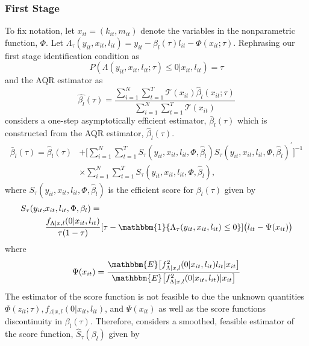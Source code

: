 \documentclass[11pt]{article}
\begin{document}
\subsubsection*{First Stage}
To fix notation, let $x_{it}=(k_{it}, m_{it})$ denote the variables in the nonparametric function, $\Phi$. Let $\Lambda_{\tau}(y_{it}, x_{it}, l_{it})=y_{it}-\beta_{l}(\tau)l_{it}-\Phi(x_{it}; \tau)$. Rephrasing our first stage identification condition as 
\begin{equation}
P(\Lambda(y_{it}, x_{it}, l_{it}; \tau)\leq0|x_{it}, l_{it})=\tau
\end{equation}
and the AQR estimator as
\begin{equation}
\hat{\beta_{l}}(\tau)=\frac{\sum_{i=1}^{N}\sum_{t=1}^{T}\mathcal{T}(x_{it})\hat{\beta}_{l}(x_{it}; \tau)}{\sum_{i=1}^{N}\sum_{t=1}^{T}\mathcal{T}(x_{it})}
\end{equation}
\cite{Lee2003} considers a one-step asymptotically efficient estimator, $\bar{\beta}_{l}(\tau)$ which is constructed from the AQR estimator, $\hat{\beta}_{l}(\tau)$.
\begin{equation}
\begin{split}
\bar{\beta}_{l}(\tau)=\hat{\beta}_{l}(\tau)&+\Big[\sum_{i=1}^{N}\sum_{t=1}^{T}S_{\tau}(y_{it}, x_{it}, l_{it},\Phi, \hat{\beta}_{l})S_{\tau}(y_{it}, x_{it}, l_{it},\Phi, \hat{\beta}_{l})^{'}\Big]^{-1}\\
&\times \sum_{i=1}^{N}\sum_{t=1}^{T}S_{\tau}(y_{it}, x_{it}, l_{it},\Phi, \hat{\beta}_{l}),
\end{split}
\end{equation}
where $S_{\tau}(y_{it}, x_{it}, l_{it},\Phi, \hat{\beta}_{l})$ is the efficient score for $\beta_{l}(\tau)$ given by
\begin{equation}
\begin{split}
S_{\tau}(y_{it}, &x_{it}, l_{it},\Phi, \beta_{l})=\\
&\frac{f_{\Lambda|x,l}(0|x_{it},l_{it})}{\tau(1-\tau)}[\tau-\mathbbm{1}\{\Lambda_{\tau}(y_{it}, x_{it}, l_{it})\leq0\}]\big(l_{it}-\Psi(x_{it})\big)
\end{split}
\end{equation}
where 
\begin{equation}
\Psi(x_{it})=\frac{\mathbbm{E}\big[f^{2}_{\Lambda|x,l}(0|x_{it},l_{it})l_{it}|x_{it}\big]}{\mathbbm{E}\big[f^{2}_{\Lambda|x,l}(0|x_{it},l_{it})|x_{it}\big]}
\end{equation}
The estimator of the score function is not feasible to due the unknown quantities $\Phi(z_{it};\tau), f_{\Lambda|x,l}(0|x_{it},l_{it})$, and $\Psi(x_{it})$ as well as the score functions discontinuity in $\beta_{l}(\tau)$. Therefore, \cite{Lee2003} considers a smoothed, feasible estimator of the score function, $\hat{S}_{\tau}(\beta_{l})$ given by
\end{document}
